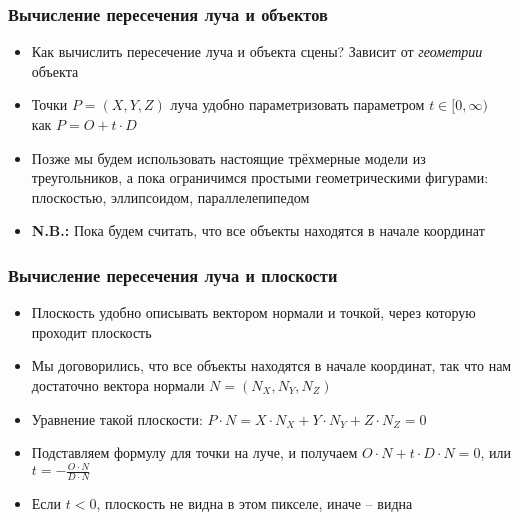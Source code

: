 \documentclass[10pt,handout]{beamer}
\begin{document}
\begin{frame}
\frametitle{Вычисление пересечения луча и объектов}
\begin{itemize}
\item Как вычислить пересечение луча и объекта сцены? \pause Зависит от \textit{геометрии} объекта
\pause
\item Точки \begin{math}P = (X,Y,Z)\end{math} луча удобно параметризовать параметром \begin{math}t \in [0, \infty)\end{math} как \begin{math}P = O + t \cdot D\end{math}
\pause
\item Позже мы будем использовать настоящие трёхмерные модели из треугольников, а пока ограничимся простыми геометрическими фигурами: плоскостью, эллипсоидом, параллелепипедом
\pause
\item \alert{\textbf{N.B.:}} Пока будем считать, что все объекты находятся в начале координат
\end{itemize}
\end{frame}

\begin{frame}
\frametitle{Вычисление пересечения луча и плоскости}
\begin{itemize}
\item Плоскость удобно описывать вектором нормали и точкой, через которую проходит плоскость
\pause
\item Мы договорились, что все объекты находятся в начале координат, так что нам достаточно вектора нормали \begin{math}N = (N_X, N_Y, N_Z)\end{math}
\pause
\item Уравнение такой плоскости: \begin{math}P\cdot N = X\cdot N_X+Y\cdot N_Y+Z\cdot N_Z=0\end{math}
\pause
\item Подставляем формулу для точки на луче, и получаем \begin{math}O \cdot N + t \cdot D \cdot N = 0\end{math}, или \begin{math}t = -\frac{O \cdot N}{D \cdot N}\end{math}
\pause
\item Если \begin{math}t<0\end{math}, плоскость не видна в этом пикселе, иначе -- видна
\end{itemize}
\end{frame}
\end{document}
